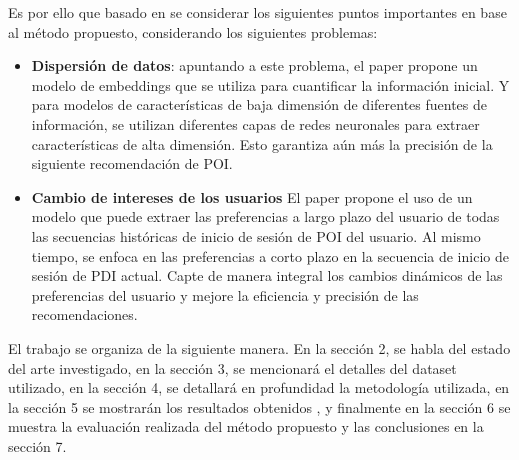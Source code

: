 \documentclass[sigplan,screen]{acmart}
\begin{document}
Es por ello que basado en \cite{wang2021poi} se considerar los siguientes puntos importantes en base al método propuesto, considerando los siguientes problemas:
\begin{itemize}
\item \textbf{Dispersión de datos}: apuntando a este problema, el paper propone un modelo de embeddings que se utiliza para cuantificar la información inicial. Y para modelos de características de baja dimensión de diferentes fuentes de información, se utilizan diferentes capas de redes neuronales para extraer características de alta dimensión. Esto garantiza aún más la precisión de la siguiente recomendación de POI.\\

\item \textbf{Cambio de intereses de los usuarios } El paper propone el uso de un modelo que puede extraer las preferencias a largo plazo del usuario de todas las secuencias históricas de inicio de sesión de POI del usuario. Al mismo tiempo, se enfoca en las preferencias a corto plazo en la secuencia de inicio de sesión de PDI actual. Capte de manera integral los cambios dinámicos de las preferencias del usuario y mejore la eficiencia y precisión de las recomendaciones.
\end{itemize}

El trabajo se organiza de la siguiente manera. En la sección 2, se habla del estado del arte investigado, en la sección 3, se mencionará el detalles del dataset utilizado, en la sección 4, se detallará en profundidad la metodología utilizada, en la sección 5 se mostrarán los resultados obtenidos , y finalmente en la sección 6 se muestra la evaluación realizada del método propuesto y las conclusiones en la sección 7.
\end{document}

